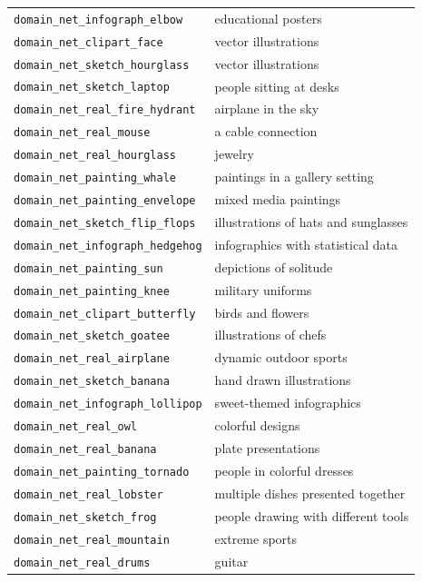 \documentclass{article} %
\begin{document}
\begin{longtable}{p{} p{}}
\texttt{domain\_net\_infograph\_elbow} & educational posters \\
\texttt{domain\_net\_clipart\_face} & vector illustrations \\
\texttt{domain\_net\_sketch\_hourglass} & vector illustrations \\
\texttt{domain\_net\_sketch\_laptop} & people sitting at desks \\
\texttt{domain\_net\_real\_fire\_hydrant} & airplane in the sky \\
\texttt{domain\_net\_real\_mouse} & a cable connection \\
\texttt{domain\_net\_real\_hourglass} & jewelry \\
\texttt{domain\_net\_painting\_whale} & paintings in a gallery setting \\
\texttt{domain\_net\_painting\_envelope} & mixed media paintings \\
\texttt{domain\_net\_sketch\_flip\_flops} & illustrations of hats and sunglasses \\
\texttt{domain\_net\_infograph\_hedgehog} & infographics with statistical data \\
\texttt{domain\_net\_painting\_sun} & depictions of solitude \\
\texttt{domain\_net\_painting\_knee} & military uniforms \\
\texttt{domain\_net\_clipart\_butterfly} & birds and flowers \\
\texttt{domain\_net\_sketch\_goatee} & illustrations of chefs \\
\texttt{domain\_net\_real\_airplane} & dynamic outdoor sports \\
\texttt{domain\_net\_sketch\_banana} & hand drawn illustrations \\
\texttt{domain\_net\_infograph\_lollipop} & sweet-themed infographics \\
\texttt{domain\_net\_real\_owl} & colorful designs \\
\texttt{domain\_net\_real\_banana} & plate presentations \\
\texttt{domain\_net\_painting\_tornado} & people in colorful dresses \\
\texttt{domain\_net\_real\_lobster} & multiple dishes presented together \\
\texttt{domain\_net\_sketch\_frog} & people drawing with different tools \\
\texttt{domain\_net\_real\_mountain} & extreme sports \\
\texttt{domain\_net\_real\_drums} & guitar \\

\end{longtable}
\end{document}
